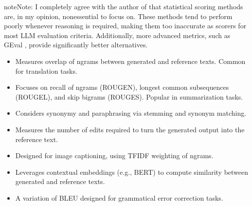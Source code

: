 \documentclass[letterpaper,11pt,english]{sphinxmanual}
\begin{document}
\begin{sphinxadmonition}{note}{Note:}
\sphinxAtStartPar
I completely agree with the author of 
that statistical scoring methods are,
in my opinion, non\sphinxhyphen{}essential to focus on. These methods tend to perform poorly
whenever reasoning is required, making them too inaccurate as scorers for
most LLM evaluation criteria. Additionally, more advanced metrics,
such as GEval {\hyperref[\detokenize{evaluation:sec-geval}]{}}, provide significantly better alternatives.
\end{sphinxadmonition}
\begin{itemize}
\item {} 
\sphinxAtStartPar
{}
Measures overlap of n\sphinxhyphen{}grams between generated and reference texts.
Common for translation tasks.

\item {} 
\sphinxAtStartPar
{}
Focuses on recall of n\sphinxhyphen{}grams (ROUGE\sphinxhyphen{}N), longest common subsequences (ROUGE\sphinxhyphen{}L),
and skip bigrams (ROUGE\sphinxhyphen{}S). Popular in summarization tasks.

\item {} 
\sphinxAtStartPar
{}
Considers synonymy and paraphrasing via stemming and synonym matching.

\item {} 
\sphinxAtStartPar
{}
Measures the number of edits required to turn the generated output into the
reference text.

\item {} 
\sphinxAtStartPar
{}
Designed for image captioning, using TF\sphinxhyphen{}IDF weighting of n\sphinxhyphen{}grams.

\item {} 
\sphinxAtStartPar
{}
Leverages contextual embeddings (e.g., BERT) to compute similarity between
generated and reference texts.

\item {} 
\sphinxAtStartPar
{}
A variation of BLEU designed for grammatical error correction tasks.

\end{itemize}
\end{document}

